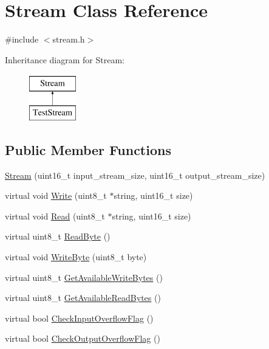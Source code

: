 \hypertarget{class_stream}{\section{Stream Class Reference}
\label{class_stream}
}


{\ttfamily \#include $<$stream.\-h$>$}

Inheritance diagram for Stream\-:\begin{figure}[H]
\begin{center}
\leavevmode
\includegraphics[height=2.000000cm]{class_stream}
\end{center}
\end{figure}
\subsection*{Public Member Functions}
\begin{DoxyCompactItemize}
\item 
\hyperlink{class_stream_a2b738d6f4d3059de2ae3d444d68663bf}{Stream} (uint16\-\_\-t input\-\_\-stream\-\_\-size, uint16\-\_\-t output\-\_\-stream\-\_\-size)
\item 
virtual void \hyperlink{class_stream_a508be3423e4d99ab2757275fb723002a}{Write} (uint8\-\_\-t $\ast$string, uint16\-\_\-t size)
\item 
virtual void \hyperlink{class_stream_a4f3ec0f7a24ddcfd054566feb614afba}{Read} (uint8\-\_\-t $\ast$string, uint16\-\_\-t size)
\item 
virtual uint8\-\_\-t \hyperlink{class_stream_aeb3f1b3d55f4b502c02d73ce4de42714}{Read\-Byte} ()
\item 
virtual void \hyperlink{class_stream_aeaed767b3a8d946c6f81465fa83ff17f}{Write\-Byte} (uint8\-\_\-t byte)
\item 
virtual uint8\-\_\-t \hyperlink{class_stream_a6a16ddb03d3360cef4daf4d38245091d}{Get\-Available\-Write\-Bytes} ()
\item 
virtual uint8\-\_\-t \hyperlink{class_stream_a71cec6c46f3d50cc3ab420e93ae434e1}{Get\-Available\-Read\-Bytes} ()
\item 
virtual bool \hyperlink{class_stream_a088c4e68d568acfad715c56f408fe9f8}{Check\-Input\-Overflow\-Flag} ()
\item 
virtual bool \hyperlink{class_stream_aee6c201819b874c5934a270592d9d311}{Check\-Output\-Overflow\-Flag} ()
\end{DoxyCompactItemize}
